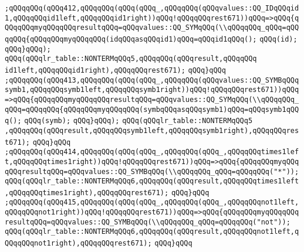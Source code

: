 \verb|;qQQqqQQq(qQQq412,qQQqqQQq(qQQq(qQQq_,qQQqqQQq(qQQqvalues::QQ_IDqQQqid1,qQQqqQQqid1left,qQQqqQQqid1right))qQQq!qQQqqQQqrest671))qQQq=>qQQq{qQQqqQQqmyqQQqqQQqresultqQQq=qQQqvalues::QQ_SYMqQQq(\\qQQqqQQq_qQQq=qQQqqQQq{qQQqqQQqmyqQQqqQQq(idqQQqasqQQqid1)qQQq=qQQqid1qQQq();|\newline
\verb|qQQq(id);|\newline
\verb|qQQq}qQQq);|\newline
\verb|qQQq(qQQqlr_table::NONTERMqQQq5,qQQqqQQq(qQQqresult,qQQqqQQq|\newline
\verb|id1left,qQQqqQQqid1right),qQQqqQQqrest671);|\newline
\verb|qQQq}qQQq|\newline
\verb|;qQQqqQQq(qQQq413,qQQqqQQq(qQQq(qQQq_,qQQqqQQq(qQQqvalues::QQ_SYMBqQQqsymb1,qQQqqQQqsymb1left,qQQqqQQqsymb1right))qQQq!qQQqqQQqrest671))qQQq=>qQQq{qQQqqQQqmyqQQqqQQqresultqQQq=qQQqvalues::QQ_SYMqQQq(\\qQQqqQQq_qQQq=qQQqqQQq{qQQqqQQqmyqQQqqQQq(symbqQQqasqQQqsymb1)qQQq=qQQqsymb1qQQq();|\newline
\verb|qQQq(symb);|\newline
\verb|qQQq}qQQq);|\newline
\verb|qQQq(qQQqlr_table::NONTERMqQQq5|\newline
\verb|,qQQqqQQq(qQQqresult,qQQqqQQqsymb1left,qQQqqQQqsymb1right),qQQqqQQqrest671);|\newline
\verb|qQQq}qQQq|\newline
\verb|;qQQqqQQq(qQQq414,qQQqqQQq(qQQq(qQQq_,qQQqqQQq(qQQq_,qQQqqQQqtimes1left,qQQqqQQqtimes1right))qQQq!qQQqqQQqrest671))qQQq=>qQQq{qQQqqQQqmyqQQqqQQqresultqQQq=qQQqvalues::QQ_SYMBqQQq(\\qQQqqQQq_qQQq=qQQqqQQq("*"));|\newline
\verb|qQQq(qQQqlr_table::NONTERMqQQq6,qQQqqQQq(qQQqresult,qQQqqQQqtimes1left,qQQqqQQqtimes1right),qQQqqQQqrest671);|\newline
\verb|qQQq}qQQq|\newline
\verb|;qQQqqQQq(qQQq415,qQQqqQQq(qQQq(qQQq_,qQQqqQQq(qQQq_,qQQqqQQqnot1left,qQQqqQQqnot1right))qQQq!qQQqqQQqrest671))qQQq=>qQQq{qQQqqQQqmyqQQqqQQqresultqQQq=qQQqvalues::QQ_SYMBqQQq(\\qQQqqQQq_qQQq=qQQqqQQq("not"));|\newline
\verb|qQQq(qQQqlr_table::NONTERMqQQq6,qQQqqQQq(qQQqresult,qQQqqQQqnot1left,qQQqqQQqnot1right),qQQqqQQqrest671);|\newline
\verb|qQQq}qQQq|\newline
